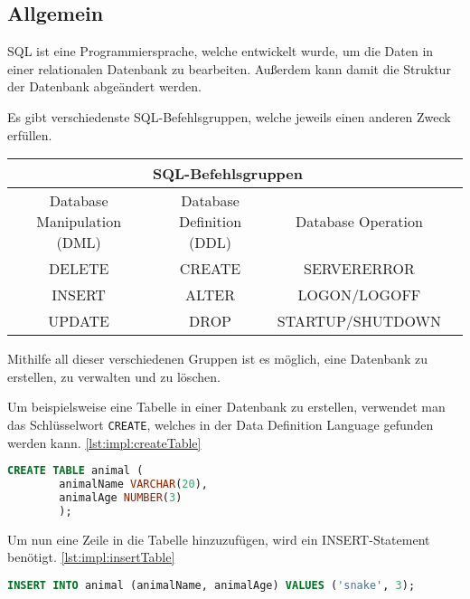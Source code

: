 \subsection{Allgemein}
SQL ist eine Programmiersprache, welche entwickelt wurde, um die Daten in einer relationalen Datenbank zu bearbeiten. Außerdem kann damit die Struktur der Datenbank abgeändert werden.
 
Es gibt verschiedenste SQL-Befehlsgruppen, welche jeweils einen anderen Zweck erfüllen.
 
\begin{center}
    \begin{tabular}{ |c|c|c|c| }
     \hline
     \multicolumn{3}{|c|}{SQL-Befehlsgruppen } \\
     \hline
     \hline
     Database Manipulation (DML) & Database Definition (DDL) & Database Operation  \\
     \hline
     \hline
     DELETE & CREATE & SERVERERROR \\
     \hline
     INSERT & ALTER & LOGON/LOGOFF \\
     \hline
     UPDATE & DROP & STARTUP/SHUTDOWN \\
     \hline
    \end{tabular}
    \end{center}
 
Mithilfe all dieser verschiedenen Gruppen ist es möglich, eine Datenbank zu erstellen, zu verwalten und zu löschen.
 
Um beispielsweise eine Tabelle in einer Datenbank zu erstellen, verwendet man das Schlüsselwort \texttt{CREATE}, welches in der Data Definition Language gefunden werden kann. \ref{lst:impl:createTable}
 
\begin{lstlisting}[language=sql,caption=CREATE table,label=lst:impl:createTable]
    CREATE TABLE animal (
        animalName VARCHAR(20),
        animalAge NUMBER(3)
        );
\end{lstlisting}
 
Um nun eine Zeile in die Tabelle hinzuzufügen, wird ein INSERT-Statement benötigt. \ref{lst:impl:insertTable}
 
\begin{lstlisting}[language=sql,caption=CREATE table,label=lst:impl:insertTable]
        INSERT INTO animal (animalName, animalAge) VALUES ('snake', 3);
\end{lstlisting}
 
